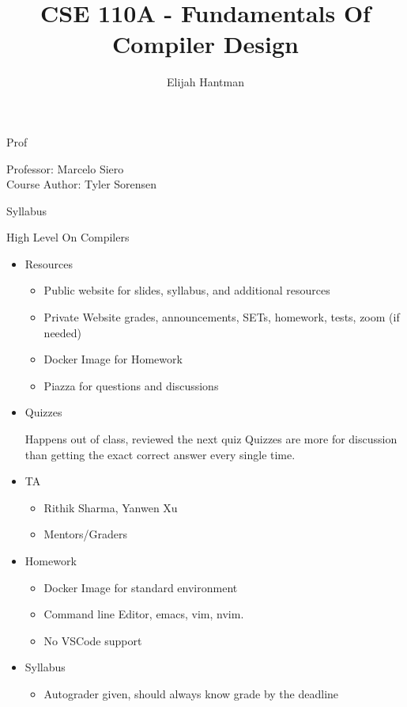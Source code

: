 \documentclass{report}
\title{\Huge{CSE 110A - Fundamentals Of Compiler Design}}
\author{\huge{Elijah Hantman}}
\date{}
\begin{document}
\maketitle
\newpage

\begin{description}
    \item Prof
        \begin{mdframed}
            Professor: Marcelo Siero\\
            Course Author: Tyler Sorensen 
        \end{mdframed}
    \item Syllabus
    \item High Level On Compilers
\end{description}

\begin{itemize}
    \item Resources
        \begin{itemize}
            \item Public website for slides, syllabus, and additional resources
            \item Private Website grades, announcements, SETs, homework, tests, zoom (if needed)
            \item Docker Image for Homework
            \item Piazza for questions and discussions
        \end{itemize}
    \item Quizzes
        \begin{mdframed}
            Happens out of class, reviewed the next quiz
            Quizzes are more for discussion than getting the
            exact correct answer every single time.
        \end{mdframed}
    \item TA
        \begin{itemize}
            \item Rithik Sharma, Yanwen Xu
            \item Mentors/Graders
        \end{itemize}
    \item Homework
        \begin{itemize}
            \item Docker Image for standard environment
            \item Command line Editor, emacs, vim, nvim.
            \item No VSCode support
        \end{itemize}
    \item Syllabus
        \begin{itemize}
            \item Autograder given, should always know grade by the deadline
        \end{itemize}
\end{itemize}
\end{document}
